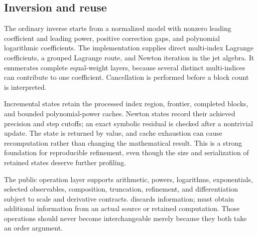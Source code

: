 \documentclass[11pt,a4paper]{article}
\newcommand{\code}[1]{\texttt{\detokenize{#1}}}
\theoremstyle{remark}\newtheorem{remark}[proposition]{Remark}
\begin{document}
\subsection{Inversion and reuse}
The ordinary inverse starts from a normalized model with nonzero leading coefficient and leading power, positive correction gaps, and polynomial logarithmic coefficients. The implementation supplies direct multi-index Lagrange coefficients, a grouped Lagrange route, and Newton iteration in the jet algebra. It enumerates complete equal-weight layers, because several distinct multi-indices can contribute to one coefficient. Cancellation is performed before a block count is interpreted.\cite{core,incremental}

Incremental states retain the processed index region, frontier, completed blocks, and bounded polynomial-power caches. Newton states record their achieved precision and step cutoffs; an exact symbolic residual is checked after a nontrivial update. The state is returned by value, and cache exhaustion can cause recomputation rather than changing the mathematical result. This is a strong foundation for reproducible refinement, even though the size and serialization of retained states deserve further profiling.\cite{incremental}

The public operation layer supports arithmetic, powers, logarithms, exponentials, selected observables, composition, truncation, refinement, and differentiation subject to scale and derivative contracts. \code{SeriesTruncate} discards information; \code{SeriesRefine} must obtain additional information from an actual source or retained computation. Those operations should never become interchangeable merely because they both take an order argument.\cite{operations,arithmetic,guide}
\end{document}
